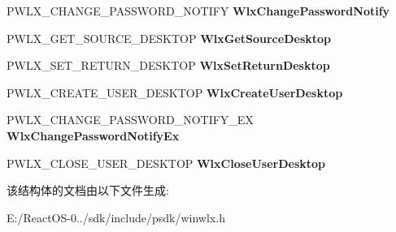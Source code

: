 \begin{DoxyCompactItemize}
\mbox{\label{struct___w_l_x___d_i_s_p_a_t_c_h___v_e_r_s_i_o_n__1__2_a8c5a251b5624e5b5580485ffdd46a87e}} 
P\+W\+L\+X\+\_\+\+C\+H\+A\+N\+G\+E\+\_\+\+P\+A\+S\+S\+W\+O\+R\+D\+\_\+\+N\+O\+T\+I\+FY {\bfseries Wlx\+Change\+Password\+Notify}
\item 
\mbox{\label{struct___w_l_x___d_i_s_p_a_t_c_h___v_e_r_s_i_o_n__1__2_a6c38ed5cefe50ef496e3ed8fde12e882}} 
P\+W\+L\+X\+\_\+\+G\+E\+T\+\_\+\+S\+O\+U\+R\+C\+E\+\_\+\+D\+E\+S\+K\+T\+OP {\bfseries Wlx\+Get\+Source\+Desktop}
\item 
\mbox{\label{struct___w_l_x___d_i_s_p_a_t_c_h___v_e_r_s_i_o_n__1__2_aac5f1d49473ce64d5b6f1a67241073a4}} 
P\+W\+L\+X\+\_\+\+S\+E\+T\+\_\+\+R\+E\+T\+U\+R\+N\+\_\+\+D\+E\+S\+K\+T\+OP {\bfseries Wlx\+Set\+Return\+Desktop}
\item 
\mbox{\label{struct___w_l_x___d_i_s_p_a_t_c_h___v_e_r_s_i_o_n__1__2_a3212d508118b0a3e0992181600866259}} 
P\+W\+L\+X\+\_\+\+C\+R\+E\+A\+T\+E\+\_\+\+U\+S\+E\+R\+\_\+\+D\+E\+S\+K\+T\+OP {\bfseries Wlx\+Create\+User\+Desktop}
\item 
\mbox{\label{struct___w_l_x___d_i_s_p_a_t_c_h___v_e_r_s_i_o_n__1__2_a09ebadc04657641997f9f239fad2db63}} 
P\+W\+L\+X\+\_\+\+C\+H\+A\+N\+G\+E\+\_\+\+P\+A\+S\+S\+W\+O\+R\+D\+\_\+\+N\+O\+T\+I\+F\+Y\+\_\+\+EX {\bfseries Wlx\+Change\+Password\+Notify\+Ex}
\item 
\mbox{\label{struct___w_l_x___d_i_s_p_a_t_c_h___v_e_r_s_i_o_n__1__2_a1bc818f58bdbeb8c614a78b78491c669}} 
P\+W\+L\+X\+\_\+\+C\+L\+O\+S\+E\+\_\+\+U\+S\+E\+R\+\_\+\+D\+E\+S\+K\+T\+OP {\bfseries Wlx\+Close\+User\+Desktop}
\end{DoxyCompactItemize}


该结构体的文档由以下文件生成\+:\begin{DoxyCompactItemize}
\item 
E\+:/\+React\+O\+S-\/0../sdk/include/psdk/winwlx.\+h\end{DoxyCompactItemize}
